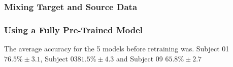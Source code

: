 
\subsubsection{Mixing Target and Source Data}


\subsubsection{Using a Fully Pre-Trained Model}
The average accuracy for the 5 models before retraining was.
Subject 01 $76.5\%\pm3.1$, Subject 03$81.5\%\pm4.3$ and Subject 09 $65.8\%\pm2.7$

